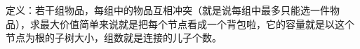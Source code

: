 \documentclass[E:/GsjzTle/main/main.tex]{subfiles}
\begin{document}
定义：若干组物品，每组中的物品互相冲突（就是说每组中最多只能选一件物品），求最大价值简单来说就是把每个节点看成一个背包啦，它的容量就是以这个节点为根的子树大小，组数就是连接的儿子个数。
\end{document}

